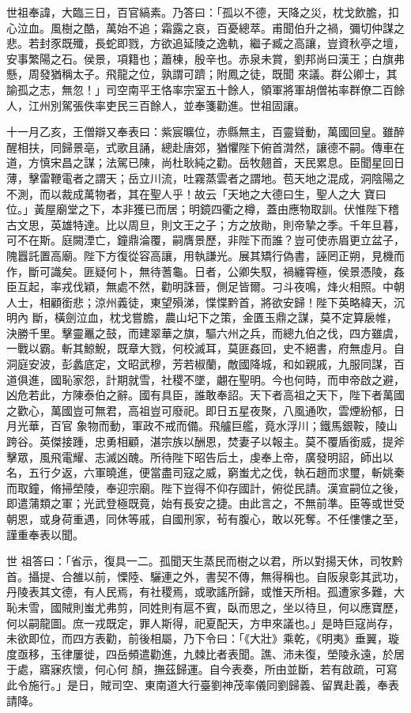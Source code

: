 \begin{pinyinscope}
 世祖奉諱，大臨三日，百官縞素。乃答曰：「孤以不德，天降之災，枕戈飲膽，扣心泣血。風樹之酷，萬始不追；霜露之哀，百憂總萃。甫聞伯升之禍，彌切仲謀之悲。若封豕既殲，長蛇即戮，方欲追延陵之逸軌，繼子臧之高讓，豈資秋亭之壇，安事繁陽之石。侯景，項籍也；蕭棟，殷辛也。赤泉未賞，劉邦尚曰漢王；白旗弗懸，周發猶稱太子。飛龍之位，孰謂可躋；附鳳之徒，既聞
 來議。群公卿士，其諭孤之志，無忽！」司空南平王恪率宗室五十餘人，領軍將軍胡僧祐率群僚二百餘人，江州別駕張佚率吏民三百餘人，並奉箋勸進。世祖固讓。



 十一月乙亥，王僧辯又奉表曰：紫宸曠位，赤縣無主，百靈聳動，萬國回皇。雖醉醒相扶，同歸景亳，式歌且誦，總赴唐郊，猶懼陛下俯首潸然，讓德不嗣。傳車在道，方慎宋昌之謀；法駕已陳，尚杜耿純之勸。岳牧翹首，天民累息。臣聞星回日薄，擊雷鞭電者之謂天；岳立川流，吐霧蒸雲者之謂地。苞天地之混成，洞陰陽之不測，而以裁成萬物者，其在聖人乎！故云「天地之大德曰生，聖人之大
 寶曰位。」黃屋廟堂之下，本非獲已而居；明鏡四衢之樽，蓋由應物取訓。伏惟陛下稽古文思，英雄特達。比以周旦，則文王之子；方之放勛，則帝摯之季。千年旦暮，可不在斯。庭闕湮亡，鐘鼎淪覆，嗣膺景歷，非陛下而誰？豈可使赤眉更立盆子，隗囂託置高廟。陛下方復從容高讓，用執謙光。展其矯行偽書，誣罔正朔，見機而作，斷可識矣。匪疑何卜，無待蓍龜。日者，公卿失馭，禍纏霄極，侯景憑陵，姦臣互起，率戎伐穎，無處不然，勸明誅晉，側足皆爾。刁斗夜鳴，烽火相照。中朝人士，相顧銜悲；涼州義徒，東望殞涕，惵惵黔首，將欲安歸！陛下英略緯天，沉明內
 斷，橫劍泣血，枕戈嘗膽，農山圮下之策，金匱玉鼎之謀，莫不定算扆帷，決勝千里。擊靈鼉之鼓，而建翠華之旗，驅六州之兵，而總九伯之伐，四方雖虞，一戰以霸。斬其鯨鯢，既章大戮，何校滅耳，莫匪姦回，史不絕書，府無虛月。自洞庭安波，彭蠡底定，文昭武穆，芳若椒蘭，敵國降城，和如親戚，九服同謀，百道俱進，國恥家怨，計期就雪，社稷不墜，翽在聖明。今也何時，而申帝啟之避，凶危若此，方陳泰伯之辭。國有具臣，誰敢奉詔。天下者高祖之天下，陛下者萬國之歡心，萬國豈可無君，高祖豈可廢祀。即日五星夜聚，八風通吹，雲煙紛郁，日月光華，百官
 象物而動，軍政不戒而備。飛艫巨艦，竟水浮川；鐵馬銀鞍，陵山跨谷。英傑接踵，忠勇相顧，湛宗族以酬恩，焚妻子以報主。莫不覆盾銜威，提斧擊眾，風飛電耀、志滅凶醜。所待陛下昭告后土，虔奉上帝，廣發明詔，師出以名，五行夕返，六軍曉進，便當盡司寇之威，窮蚩尤之伐，執石趙而求璽，斬姚秦而取鐘，脩掃塋陵，奉迎宗廟。陛下豈得不仰存國計，俯從民請。漢宣嗣位之後，即遣蒲類之軍；光武登極既竟，始有長安之捷。由此言之，不無前準。臣等或世受朝恩，或身荷重遇，同休等戚，自國刑家，茍有腹心，敢以死奪。不任慺慺之至，謹重奉表以聞。



 世
 祖答曰：「省示，復具一二。孤聞天生蒸民而樹之以君，所以對揚天休，司牧黔首。攝提、合雒以前，慄陸、驪連之外，書契不傳，無得稱也。自阪泉彰其武功，丹陵表其文德，有人民焉，有社稷焉，或歌謠所歸，或惟天所相。孤遭家多難，大恥未雪，國賊則蚩尤弗剪，同姓則有扈不賓，臥而思之，坐以待旦，何以應寶歷，何以嗣龍圖。庶一戎既定，罪人斯得，祀夏配天，方申來議也。」是時巨寇尚存，未欲即位，而四方表勸，前後相屬，乃下令曰：「《大壯》乘乾，《明夷》垂翼，璇度亟移，玉律屢徙，四岳頻遣勸進，九棘比者表聞。譙、沛未復，塋陵永遠，於居于處，寤寐疚懷，何心何
 顏，撫茲歸運。自今表奏，所由並斷，若有啟疏，可寫此令施行。」是日，賊司空、東南道大行臺劉神茂率儀同劉歸義、留異赴義，奉表請降。




\end{pinyinscope}
